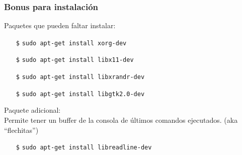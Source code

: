 \documentclass[aspectratio=169]{beamer}
\begin{document}
\begin{frame}
    \frametitle{Bonus para instalación}
    Paquetes que pueden faltar instalar:\\
    \vspace{0.3cm}
    \begin{itemize}
    \setlength\itemsep{0.5em}
    \item[\texttt{\$}] \small \texttt{sudo apt-get install xorg-dev}
    \item[\texttt{\$}] \small \texttt{sudo apt-get install libx11-dev}
    \item[\texttt{\$}] \small \texttt{sudo apt-get install libxrandr-dev}
    \item[\texttt{\$}] \small \texttt{sudo apt-get install libgtk2.0-dev}
    \end{itemize}
    \vspace{0.5cm}
    \pause
    Paquete adicional:\\
    \vspace{0.3cm}
    \small Permite tener un buffer de la consola de últimos comandos ejecutados. (aka ``flechitas'')
    \begin{itemize}
    \setlength\itemsep{0.5em}
    \item[\texttt{\$}] \small \texttt{sudo apt-get install libreadline-dev}
    \end{itemize}
\end{frame}
\end{document}
